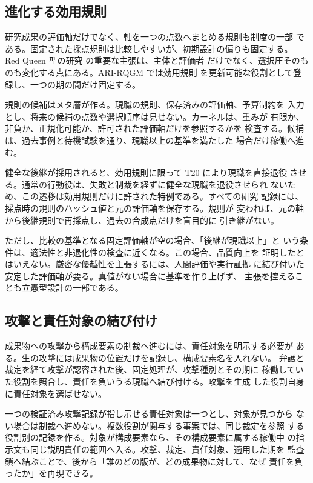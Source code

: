 \subsection{進化する効用規則}\label{sec:rqgm:utility}

研究成果の評価軸だけでなく、軸を一つの点数へまとめる規則も制度の一部
である。固定された採点規則は比較しやすいが、初期設計の偏りも固定する。
Red Queen 型の研究 \cite{iacob2026red} の重要な主張は、主体と評価者
だけでなく、選択圧そのものも変化する点にある。ARI-RQGM では効用規則
を更新可能な役割として登録し、一つの期の間だけ固定する。

規則の候補はメタ層が作る。現職の規則、保存済みの評価軸、予算制約を
入力とし、将来の候補の点数や選択順序は見せない。カーネルは、重みが
有限か、非負か、正規化可能か、許可された評価軸だけを参照するかを
検査する。候補は、過去事例と待機試験を通り、現職以上の基準を満たした
場合だけ稼働へ進む。

健全な後継が採用されると、効用規則に限って T20 により現職を直接退役
させる。通常の行動役は、失敗と制裁を経ずに健全な現職を退役させられ
ないため、この遷移は効用規則だけに許された特例である。すべての研究
記録には、採点時の規則のハッシュ値と元の評価軸を保存する。規則が
変われば、元の軸から後継規則で再採点し、過去の合成点だけを盲目的に
引き継がない。

ただし、比較の基準となる固定評価軸が空の場合、「後継が現職以上」と
いう条件は、適法性と非退化性の検査に近くなる。この場合、品質向上を
証明したとはいえない。厳密な優越性を主張するには、人間評価や実行証拠
に結び付いた安定した評価軸が要る。真値がない場合に基準を作り上げず、
主張を控えることも立憲型設計の一部である。

\subsection{攻撃と責任対象の結び付け}\label{sec:rqgm:targetbinding}

成果物への攻撃から構成要素の制裁へ進むには、責任対象を明示する必要が
ある。生の攻撃には成果物の位置だけを記録し、構成要素名を入れない。
弁護と裁定を経て攻撃が認容された後、固定処理が、攻撃種別とその期に
稼働していた役割を照合し、責任を負いうる現職へ結び付ける。攻撃を生成
した役割自身に責任対象を選ばせない。

一つの検証済み攻撃記録が指し示せる責任対象は一つとし、対象が見つから
ない場合は制裁へ進めない。複数役割が関与する事案では、同じ裁定を参照
する役割別の記録を作る。対象が構成要素なら、その構成要素に属する稼働中
の指示文も同じ説明責任の範囲へ入る。攻撃、裁定、責任対象、適用した期を
監査鎖へ結ぶことで、後から「誰のどの版が、どの成果物に対して、なぜ
責任を負ったか」を再現できる。

